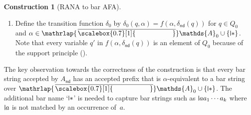 \documentclass[10pt,a4paper]{amsart}
\theoremstyle{definition}
\newtheorem{construction}[theo]{Construction}
\newcommand{\At}{\mathds{A}}
\newcommand{\op}[1]{\operatorname{\mathsf{#1}}}
\newcommand{\nd}{\op{nd}}
\DeclareMathOperator{\supp}{\mathsf{supp}}
\newcommand{\names}{\At}
\newcommand{\set}[1]{\{#1\}}
\newcommand{\mybar}[3]{%
  \mathrlap{\hspace{#2}\overline{\scalebox{#1}[1]{\phantom{\ensuremath{#3}}}}}\ensuremath{#3}
}
\newcommand{\barNames}{{\mybar{0.7}{1.25pt}{\names}}}
\newcommand{\midmid}{\hspace{0.2ex}{\rule[-0.1ex]{0.6pt}{1.65ex}}\hspace{0.2ex}}
\newcommand{\newletter}[1]{{\midmid}#1}
\renewcommand{\enquote}[1]{`#1'}
\begin{document}
\begin{construction}[RANA to bar AFA]
\begin{enumerate}
\[{\begin{cases}
        \bot & \text{if $\alpha = \newletter{\ast}$, $\Diamond_\beta q = \Diamond_\alpha q'$ for some $q'$} \\
             & \text{with $\ast \in \supp(q')$,}\\
        \top & \text{if $\Diamond_\beta q = \Diamond_\alpha q'$ for some $q'$} \\
             & \text{and $\delta_{\nd}(q') \equiv \top$,} \\
          q' & \text{if $\Diamond_\beta q = \Diamond_\alpha q'$ for some $q'$}\\
             & \text{and $\delta_{\nd}(q') \not\equiv \top$;}
           \end{cases}
           }%
      \]
      and $f(\alpha, \varphi \ast \psi) = f(\alpha, \varphi) \ast f(\alpha, \psi)$
      for $\ast \in \set{\vee,\wedge}$.
    \item Define the transition function $\delta_0$  by  $\delta_0(q, \alpha) =
      f(\alpha, \delta_{\nd}(q))$ for $q \in Q_0$ and $\alpha \in \barNames_0 \cup \set{\newletter{\ast}}$. Note that
      every variable $q'$ in $f(\alpha, \delta_{\nd}(q))$ is an element of $Q_0$ because of the support principle
      ().
  \end{enumerate}%
\end{construction}

\noindent The key observation towards the correctness of the construction is that every bar string accepted by $A_{\nd}$ has an accepted prefix that is $\alpha$-equivalent to a bar string over $\barNames_0 \cup \set{\newletter{\ast}}$. The additional bar name \enquote{$\newletter{\ast}$} is needed to capture bar strings such as $\newletter{a}a_1 \cdots a_k$ where $\newletter{a}$ is not matched by an occurrence of~$a$.
\end{document}

